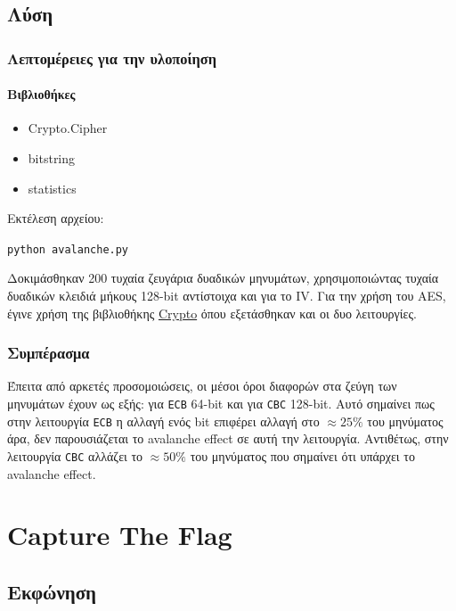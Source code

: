 \documentclass[oneside]{article}
\let\t\texttt
\begin{document}
\subsection{Λύση} 

\subsubsection{Λεπτομέρειες για την υλοποίηση}

\paragraph{Βιβλιοθήκες}

\begin{itemize}
    \item Crypto.Cipher 
    \item bitstring
    \item statistics
\end{itemize}

Εκτέλεση αρχείου:

\begin{center}
    \t{python avalanche.py}
\end{center}

Δοκιμάσθηκαν 200 τυχαία ζευγάρια δυαδικών μηνυμάτων, χρησιμοποιώντας τυχαία δυαδικών κλειδιά μήκους 128-bit αντίστοιχα και για το IV. Για την χρήση του AES, έγινε χρήση της βιβλιοθήκης \href{https://pypi.org/project/pycryptodome/}{Crypto} όπου εξετάσθηκαν και οι δυο λειτουργίες.

\subsubsection{Συμπέρασμα}

Έπειτα από αρκετές προσομοιώσεις, οι μέσοι όροι διαφορών στα ζεύγη των μηνυμάτων έχουν ως εξής: για \t{ECB} 64-bit και για \t{CBC} 128-bit. Αυτό σημαίνει πως στην λειτουργία \t{ECB} η αλλαγή ενός bit επιφέρει αλλαγή στο $\approx 25\%$ του μηνύματος άρα, δεν παρουσιάζεται το avalanche effect σε αυτή την λειτουργία. Αντιθέτως, στην λειτουργία \t{CBC} αλλάζει το $\approx 50\%$ του μηνύματος που σημαίνει ότι υπάρχει το avalanche effect.

\section{Capture The Flag}

\subsection{Εκφώνηση} 
\end{document}
